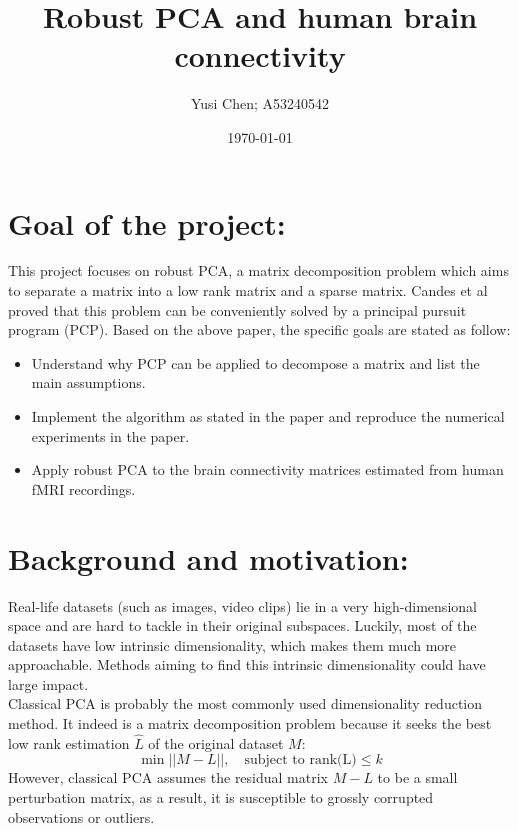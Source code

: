 \documentclass[12pt]{extarticle}
\title{Robust PCA and human brain connectivity}
\author{Yusi Chen; A53240542}
\date{\today}
\newcommand{\<}{\langle}
\renewcommand{\>}{\rangle}
\theoremstyle{definition}
\begin{document}
\maketitle

\tableofcontents

\section{Goal of the project:}
This project focuses on robust PCA, a matrix decomposition problem which aims to separate a matrix into a low rank matrix and a sparse matrix. Candes et al \cite{candes2011robust} proved that this problem can be conveniently solved by a principal pursuit program (PCP). Based on the above paper, the specific goals are stated as follow: 
\begin{itemize}
    \item Understand why PCP can be applied to decompose a matrix and list the main assumptions.
    \item Implement the algorithm as stated in the paper and reproduce the numerical experiments in the paper.
    \item Apply robust PCA to the brain connectivity matrices estimated from human fMRI recordings. 
\end{itemize}

\section{Background and motivation:}
Real-life datasets (such as images, video clips) lie in a very high-dimensional space and are hard to tackle in their original subspaces. Luckily, most of the datasets have low intrinsic dimensionality, which makes them much more approachable. Methods aiming to find this intrinsic dimensionality could have large impact. \\

Classical PCA is probably the most commonly used dimensionality reduction method. It indeed is a matrix decomposition problem because it seeks the best low rank estimation $\hat{L}$ of the original dataset $M$: 
\begin{equation}
\label{pca}
\min ||M-L||, \quad \text{subject to rank(L)}\leq k     
\end{equation}
However, classical PCA assumes the residual matrix $M-L$ to be a small perturbation matrix, as a result, it is susceptible to grossly corrupted observations or outliers. \\
\end{document}

